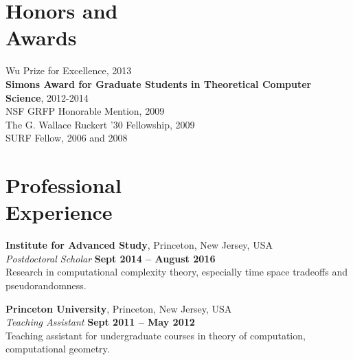 \documentclass[margin,line]{resume}
\begin{document}
\begin{resume}
    \section{\mysidestyle Honors and\\Awards} 

    Wu Prize for Excellence, 2013 \vspace{1mm}\\
    {\bf Simons Award for Graduate Students in Theoretical Computer Science}, 2012-2014		    \vspace{1mm}\\
    NSF GRFP Honorable Mention, 2009								    \vspace{1mm}\\%
    The G. Wallace Ruckert '30 Fellowship, 2009 						    \vspace{1mm}\\%
    SURF Fellow, 2006 and 2008									    \vspace{1mm}\\%
    
    \section{\mysidestyle Professional\\Experience}

    \textbf{Institute for Advanced Study}, Princeton, New Jersey, USA \vspace{2mm}\\\vspace{1mm}%
    \textsl{Postdoctoral Scholar} \hfill \textbf{Sept 2014 -- August 2016}\\
    Research in computational complexity theory, especially time space tradeoffs and pseudorandomness.

    \textbf{Princeton University}, Princeton, New Jersey, USA \vspace{2mm}\\\vspace{1mm}%
    \textsl{Teaching Assistant} \hfill \textbf{Sept 2011 -- May 2012}\\
    Teaching assistant for undergraduate courses in theory of computation, computational geometry.


\end{resume}
\end{document}
